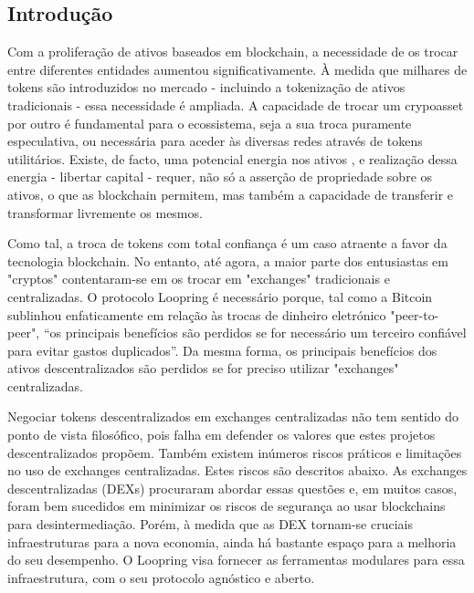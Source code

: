 \documentclass[UTF8,nofonts]{article}
\begin{document}
\begin{multicols}{2}
\section{Introdução\label{sec:introduction}}

Com a proliferação de ativos baseados em blockchain, a necessidade de os trocar entre diferentes entidades aumentou significativamente. À medida que milhares de tokens são introduzidos no mercado - incluindo a tokenização de ativos tradicionais - essa necessidade é ampliada. A
capacidade de trocar um crypoasset por outro é fundamental para o ecossistema, seja a sua troca puramente especulativa, ou necessária para aceder às diversas redes através de tokens utilitários. Existe, de facto, uma potencial energia nos ativos \cite{desotocapital}, e realização dessa energia - libertar capital - requer, não só a asserção de propriedade sobre os ativos, o que as blockchain permitem, mas também a capacidade de transferir e transformar livremente os mesmos.
 
Como tal, a troca de tokens com total confiança é um caso atraente a favor da tecnologia blockchain. No entanto, até agora, a maior parte dos entusiastas em "cryptos" contentaram-se em os trocar em "exchanges" tradicionais e centralizadas. O protocolo Loopring é necessário porque, tal como a Bitcoin \cite{nakamoto2008bitcoin} sublinhou enfaticamente em relação às trocas de dinheiro eletrónico "peer-to-peer",
\enquote{os principais benefícios são perdidos se for necessário um terceiro confiável para evitar gastos duplicados}. Da mesma forma, os principais benefícios dos ativos descentralizados são perdidos se for preciso utilizar "exchanges" centralizadas.

Negociar tokens descentralizados em exchanges centralizadas não tem sentido do ponto de vista filosófico, pois falha em defender os valores que estes projetos descentralizados propõem. Também existem inúmeros riscos práticos e limitações no uso de exchanges centralizadas. Estes riscos são descritos abaixo. As exchanges descentralizadas (DEXs) \cite{schuh2015bitshares} \cite{bancor} \cite{kyber} procuraram abordar essas questões e, em muitos casos, foram bem sucedidos em minimizar os riscos de segurança ao usar blockchains para desintermediação. Porém, à medida que as DEX tornam-se cruciais infraestruturas para a nova economia, ainda há bastante espaço para a melhoria do seu desempenho. O
Loopring visa fornecer as ferramentas modulares para essa infraestrutura, com o seu protocolo agnóstico e aberto.


\end{multicols}
\end{document}

